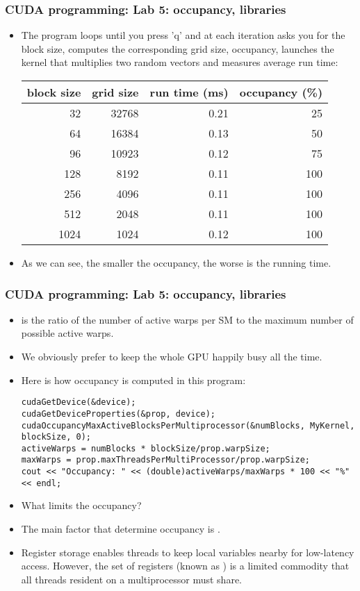 \begin{frame}[fragile]
  \frametitle{CUDA programming: Lab 5: occupancy, libraries}
\begin{itemize}
\item The program loops until you press 'q' and at each iteration asks you for the block size, computes the corresponding grid size, occupancy, launches the kernel that multiplies two random vectors and measures average run time: 
\begin{center}
\begin{tabular}{ |r|r|r|r| }
\hline
block size & grid size & run time (ms) & occupancy (\%) \\ \hline
32 & 32768 & 0.21 & 25 \\ \hline
64 & 16384 & 0.13 & 50 \\ \hline
96 & 10923 & 0.12 & 75 \\ \hline
128 & 8192 & 0.11 & 100 \\ \hline
256 & 4096 & 0.11 & 100 \\ \hline
512 & 2048 & 0.11 & 100 \\ \hline
1024 & 1024 & 0.12 &  100 \\ \hline
\end{tabular}
\end{center}
\item As we can see, the smaller the occupancy, the worse is the running time.
\end{itemize}
\end{frame}

\begin{frame}[fragile]
  \frametitle{CUDA programming: Lab 5: occupancy, libraries}
  \begin{itemize}
  \item {} is the ratio of the number of active warps per SM to the
    maximum number of possible active warps.
  \item We obviously prefer to keep the whole GPU happily busy all the time.
  \item Here is how occupancy is computed in this program:
    {\tiny
      {\color{mycolorcode}
\begin{verbatim}
cudaGetDevice(&device);
cudaGetDeviceProperties(&prop, device);
cudaOccupancyMaxActiveBlocksPerMultiprocessor(&numBlocks, MyKernel, blockSize, 0);
activeWarps = numBlocks * blockSize/prop.warpSize;
maxWarps = prop.maxThreadsPerMultiProcessor/prop.warpSize;
cout << "Occupancy: " << (double)activeWarps/maxWarps * 100 << "%" << endl;
\end{verbatim}
      }
    }
  \item What limits the occupancy?
  \item The main factor that determine occupancy is . 
  \item Register storage enables threads to keep local variables nearby for low-latency access. However, the set
    of registers (known as ) is a limited commodity that all threads resident on
    a multiprocessor must share.
  \end{itemize}
\end{frame}


